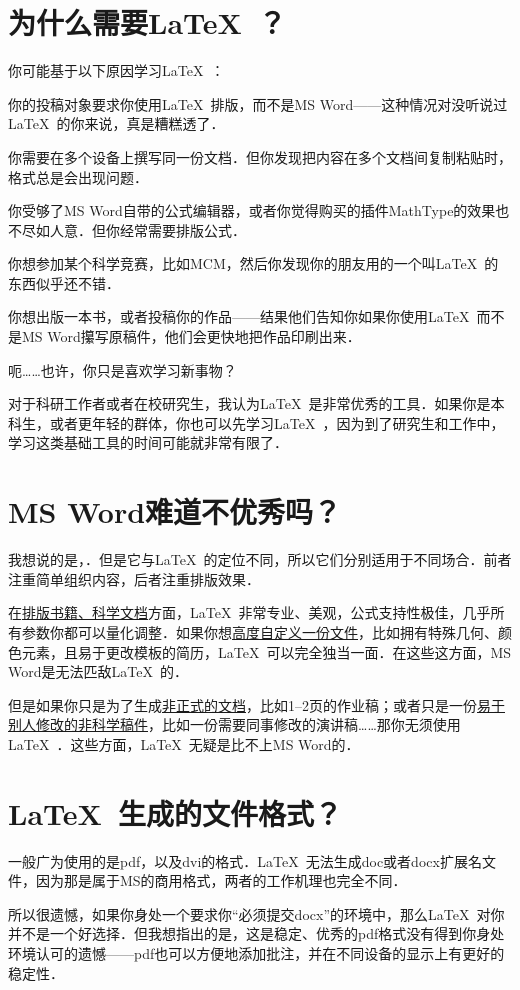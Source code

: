 \section{为什么需要\LaTeX\ ？}
你可能基于以下原因学习\LaTeX\ ：
\begin{feae}
\item 你的投稿对象要求你使用\LaTeX\ 排版，而不是MS Word——这种情况对没听说过\LaTeX\ 的你来说，真是糟糕透了．
\item 你需要在多个设备上撰写同一份文档．但你发现把内容在多个文档间复制粘贴时，格式总是会出现问题．
\item 你受够了MS Word自带的公式编辑器，或者你觉得购买的插件MathType的效果也不尽如人意．但你经常需要排版公式．
\item 你想参加某个科学竞赛，比如MCM，然后你发现你的朋友用的一个叫\LaTeX\ 的东西似乎还不错．
\item 你想出版一本书，或者投稿你的作品——结果他们告知你如果你使用\LaTeX\ 而不是MS Word攥写原稿件，他们会更快地把作品印刷出来．
\item 呃……也许，你只是喜欢学习新事物？
\end{feae}

对于科研工作者或者在校研究生，我认为\LaTeX\ 是非常优秀的工具．如果你是本科生，或者更年轻的群体，你也可以先学习\LaTeX\ ，因为到了研究生和工作中，学习这类基础工具的时间可能就非常有限了．

\section{MS Word难道不优秀吗？}
我想说的是，．但是它与\LaTeX\ 的定位不同，所以它们分别适用于不同场合．前者注重简单组织内容，后者注重排版效果．

在\uline{排版书籍、科学文档}方面，\LaTeX\ 非常专业、美观，公式支持性极佳，几乎所有参数你都可以量化调整．如果你想\uline{高度自定义一份文件}，比如拥有特殊几何、颜色元素，且易于更改模板的简历，\LaTeX\ 可以完全独当一面．在这些这方面，MS Word是无法匹敌\LaTeX\ 的．

但是如果你只是为了生成\uline{非正式的文档}，比如1--2页的作业稿；或者只是一份\uline{易于别人修改的非科学稿件}，比如一份需要同事修改的演讲稿……那你无须使用\LaTeX\ ．这些方面，\LaTeX\ 无疑是比不上MS Word的．

\section{\LaTeX\ 生成的文件格式？}
一般广为使用的是pdf，以及dvi的格式．\LaTeX\ 无法生成doc或者docx扩展名文件，因为那是属于MS的商用格式，两者的工作机理也完全不同．

所以很遗憾，如果你身处一个要求你“必须提交docx”的环境中，那么\LaTeX\ 对你并不是一个好选择．但我想指出的是，这是稳定、优秀的pdf格式没有得到你身处环境认可的遗憾——pdf也可以方便地添加批注，并在不同设备的显示上有更好的稳定性．